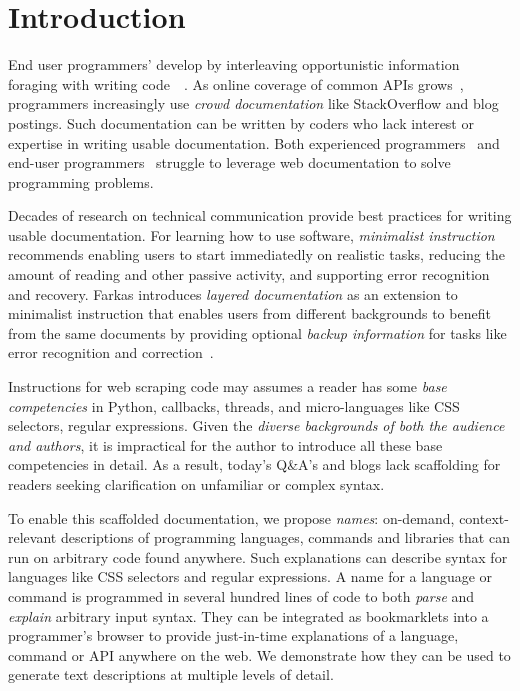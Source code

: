 \section{Introduction}

End user programmers' develop by interleaving opportunistic information foraging with writing code~\cite{brandt_two_2009}~\cite{brandt_example-centric_2010}.
As online coverage of common APIs grows~\cite{parnin_measuring_2011}, programmers increasingly use \emph{crowd documentation} like StackOverflow and blog postings.
Such documentation can be written by coders who lack interest or expertise in writing usable documentation.
Both experienced programmers~\cite{duala-ekoko_asking_2012} and end-user programmers~\cite{dorn_lost_2013}\cite{dorn_learning_2010}\cite{rosson_everyday_2004} struggle to leverage web documentation to solve programming problems.

Decades of research on technical communication provide best practices for writing usable documentation.
For learning how to use software, \emph{minimalist instruction}~\cite{carroll_nurnberg_1990} recommends enabling users to start immediatedly on realistic tasks, reducing the amount of reading and other passive activity, and supporting error recognition and recovery.
Farkas introduces \emph{layered documentation} as an extension to minimalist instruction that enables users from different backgrounds to benefit from the same documents by providing optional \emph{backup information} for tasks like error recognition and correction~\cite{farkas_layering_1998}.

Instructions for web scraping code may assumes a reader has some \emph{base competencies} in Python, callbacks, threads, and micro-languages like CSS selectors, regular expressions.
Given the \emph{diverse backgrounds of both the audience and authors}, it is impractical for the author to introduce all these base competencies in detail.
As a result, today's Q\&A's and blogs lack scaffolding for readers seeking clarification on unfamiliar or complex syntax.

To enable this scaffolded documentation, we propose \emph{\Glspl{name}}: on-demand, context-relevant descriptions of programming languages, commands and libraries that can run on arbitrary code found anywhere.
Such explanations can describe syntax for languages like CSS selectors and regular expressions.
A \gls{name} for a language or command is programmed in several hundred lines of code to both \emph{parse} and \emph{explain} arbitrary input syntax.
They can be integrated as bookmarklets into a programmer's browser to provide just-in-time explanations of a language, command or API anywhere on the web.
We demonstrate how they can be used to generate text descriptions at multiple levels of detail.



